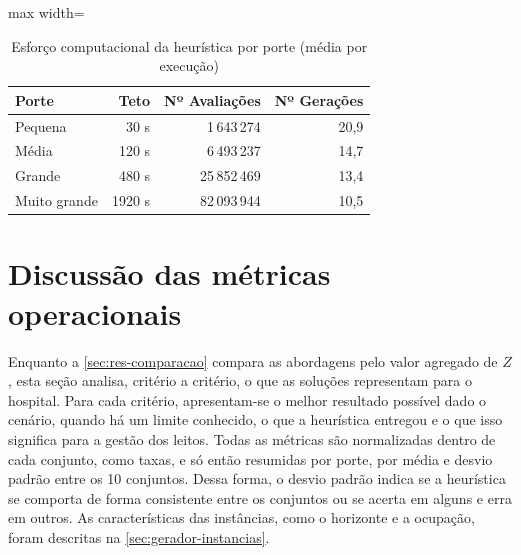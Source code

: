 \begin{table}[H]
    \caption{Esforço computacional da heurística por porte (média por execução)}
    \label{tab:res-esforco}
    \centering
    \begin{adjustbox}{max width=\textwidth}
    \begin{tabular}{lrrr}
        \hline
        \textbf{Porte} & \textbf{Teto} & \textbf{Nº Avaliações} & \textbf{Nº Gerações} \\
        \hline
        Pequena      & 30 s   & 1\,643\,274  & 20,9 \\
        Média        & 120 s  & 6\,493\,237  & 14,7 \\
        Grande       & 480 s  & 25\,852\,469 & 13,4 \\
        Muito grande & 1920 s & 82\,093\,944 & 10,5 \\
        \hline
    \end{tabular}
    \end{adjustbox}
\end{table}


\section{Discussão das métricas operacionais}
\label{sec:res-operacionais}

Enquanto a \autoref{sec:res-comparacao} compara as abordagens pelo valor agregado de $Z$, esta seção analisa, critério a critério, o que as soluções representam para o hospital. Para cada critério, apresentam-se o melhor resultado possível dado o cenário, quando há um limite conhecido, o que a heurística entregou e o que isso significa para a gestão dos leitos. Todas as métricas são normalizadas dentro de cada conjunto, como taxas, e só então resumidas por porte, por média e desvio padrão entre os 10 conjuntos. Dessa forma, o desvio padrão indica se a heurística se comporta de forma consistente entre os conjuntos ou se acerta em alguns e erra em outros. As características das instâncias, como o horizonte e a ocupação, foram descritas na \autoref{sec:gerador-instancias}.

